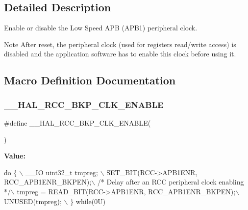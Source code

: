 \subsection{Detailed Description}
Enable or disable the Low Speed A\+PB (A\+P\+B1) peripheral clock. 

\begin{DoxyNote}{Note}
After reset, the peripheral clock (used for registers read/write access) is disabled and the application software has to enable this clock before using it. 
\end{DoxyNote}


\subsection{Macro Definition Documentation}
\mbox{\label{group___r_c_c___a_p_b1___clock___enable___disable_gaffaa413a270a2a8311d54103372aa232}} 
\subsubsection{\texorpdfstring{\+\_\+\+\_\+\+H\+A\+L\+\_\+\+R\+C\+C\+\_\+\+B\+K\+P\+\_\+\+C\+L\+K\+\_\+\+E\+N\+A\+B\+LE}{\_\_HAL\_RCC\_BKP\_CLK\_ENABLE}}
{\footnotesize\ttfamily \#define \+\_\+\+\_\+\+H\+A\+L\+\_\+\+R\+C\+C\+\_\+\+B\+K\+P\+\_\+\+C\+L\+K\+\_\+\+E\+N\+A\+B\+LE(\begin{DoxyParamCaption}{ }\end{DoxyParamCaption})}

{\bfseries Value\+:}
\begin{DoxyCode}
\textcolor{keywordflow}{do} \{ \(\backslash\)
                                        \_\_IO uint32\_t tmpreg; \(\backslash\)
                                        SET\_BIT(RCC->APB1ENR, RCC\_APB1ENR\_BKPEN);\(\backslash\)
                                        \textcolor{comment}{/* Delay after an RCC peripheral clock enabling */}\(\backslash\)
                                        tmpreg = READ\_BIT(RCC->APB1ENR, RCC\_APB1ENR\_BKPEN);\(\backslash\)
                                        UNUSED(tmpreg); \(\backslash\)
                                      \} \textcolor{keywordflow}{while}(0U)
\end{DoxyCode}


